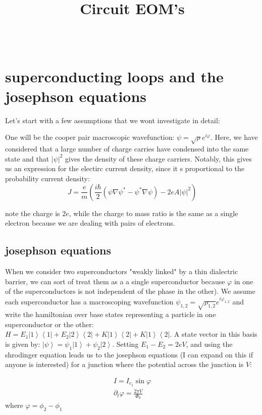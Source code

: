 \documentclass[paper=a4, twocolumn, fontsize=10pt]{article} %
\title{	
\normalfont \normalsize 
\horrule{.5pt}\\ %
\Large Circuit EOM's \\ 
\horrule{1pt}\\ %
}
\author{}
\date{\normalsize}%
\numberwithin{equation}{section} %
\numberwithin{figure}{section} %
\numberwithin{table}{section} %
\def\ket#1{\left\vert #1 \right\rangle}
\def\bra#1{\left\langle #1 \right\vert}
\begin{document}
 

\maketitle %

\section{superconducting loops and the josephson equations}

Let's start with a few assumptions that we wont investigate in detail:

One will be the cooper pair macroscopic wavefunction:
$\psi = \sqrt{\rho} e^{i\varphi}$. Here, we have considered that a large number of charge carries have condensed into the same state and that $|\psi|^2$ gives the density of these charge carriers. Notably, this gives us an expression for the electirc current density, since it s proportional to the probability current density:
 \[ J = \frac{e}{m} \left( \frac{i\hbar}{2} \left(\psi\nabla\psi^* - \psi^*\nabla\psi\right) - 2e A |\psi|^2\right) \]


 note the charge is $2e$, while the charge to mass ratio is the same as a single electron because we are dealing with pairs of electrons.
\\
\subsection{josephson equations}
When we consider two superconductors "weakly linked" by a thin dialectric barrier, we can sort of treat them as a a single superconductor because $\varphi$ in one of the superconductors is not independent of the phase in the other). We assume each superconductor has a macroscoping wavefunction $\psi_{1,2} = \sqrt{\rho_{1,2}} e^{i\varphi_{1,2}}$ and write the hamiltonian over base states representing a particle in one superconductor or the other: $H =E_1 \ket{1}\bra{1} + E_2 \ket{2}\bra{2} + K \ket{1}\bra{2} + K \ket{1}\bra{2}$. A state vector in this basis is given by: $\ket{\psi} = \psi_1 \ket{1} + \psi_2\ket{2}$.  Setting $E_1 - E_2 = 2eV$, and using the shrodinger equation leads us to the josephson equations (I can expand on this if anyone is interested) for a junction where the potential across the junction is $V$:

\begin{align}
    I = I_{c_1} \sin \varphi
    \\
    \partial_t \varphi = \frac{2\pi V}{\Phi_0}
\end{align}
where $\varphi = \phi_2 - \phi_1$
\end{document}
